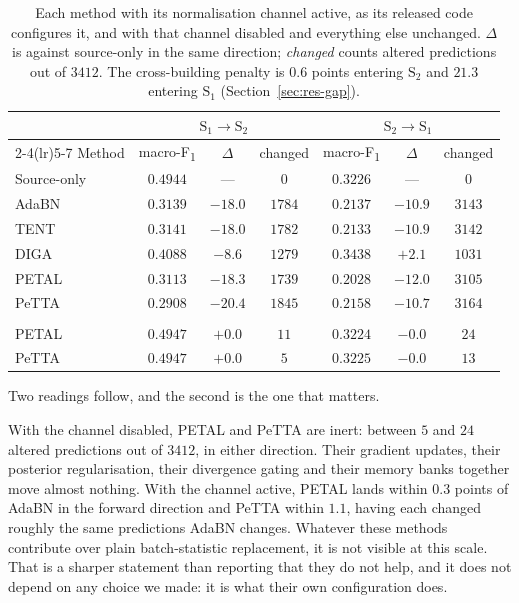 \documentclass[a4paper,fleqn]{cas-dc}
\newcommand{\macf}{macro-F\textsubscript{1}}
\begin{document}
\begin{table}[t]
\centering
\caption{Each method with its normalisation channel active, as its released code
configures it, and with that channel disabled and everything else unchanged.
$\Delta$ is against source-only in the same direction; \emph{changed} counts altered
predictions out of $3412$. The cross-building penalty is $0.6$ points entering
$\text{S}_2$ and $21.3$ entering $\text{S}_1$ (Section~\ref{sec:res-gap}).}
\label{tab:bnchannel}
\small
\begin{tabular}{lcccccc}
\toprule
 & \multicolumn{3}{c}{$\text{S}_1\!\to\!\text{S}_2$} & \multicolumn{3}{c}{$\text{S}_2\!\to\!\text{S}_1$} \\
\cmidrule(lr){2-4}\cmidrule(lr){5-7}
Method & \macf & $\Delta$ & changed & \macf & $\Delta$ & changed \\
\midrule
Source-only & $0.4944$ & --- & $0$ & $0.3226$ & --- & $0$ \\
\addlinespace[2pt]
AdaBN & $0.3139$ & $-18.0$ & $1784$ & $0.2137$ & $-10.9$ & $3143$ \\
TENT  & $0.3141$ & $-18.0$ & $1782$ & $0.2133$ & $-10.9$ & $3142$ \\
DIGA  & $0.4088$ & $-8.6$  & $1279$ & $\mathbf{0.3438}$ & $\mathbf{+2.1}$ & $1031$ \\
PETAL & $0.3113$ & $-18.3$ & $1739$ & $0.2028$ & $-12.0$ & $3105$ \\
PeTTA & $0.2908$ & $-20.4$ & $1845$ & $0.2158$ & $-10.7$ & $3164$ \\
\addlinespace[3pt]
\multicolumn{7}{l}{\emph{normalisation channel disabled, everything else identical}} \\
\addlinespace[2pt]
PETAL & $0.4947$ & $+0.0$ & $11$ & $0.3224$ & $-0.0$ & $24$ \\
PeTTA & $0.4947$ & $+0.0$ & $5$  & $0.3225$ & $-0.0$ & $13$ \\
\bottomrule
\end{tabular}
\end{table}

Two readings follow, and the second is the one that matters.

With the channel disabled, PETAL and PeTTA are inert: between $5$ and $24$ altered
predictions out of $3412$, in either direction. Their gradient updates, their posterior
regularisation, their divergence gating and their memory banks together move almost
nothing. With the channel active, PETAL lands within $0.3$ points of AdaBN in the forward
direction and PeTTA within $1.1$, having each changed roughly the same predictions AdaBN
changes. Whatever these methods contribute over plain batch-statistic replacement, it is
not visible at this scale. That is a sharper statement than reporting that they do not
help, and it does not depend on any choice we made: it is what their own configuration
does.
\end{document}
